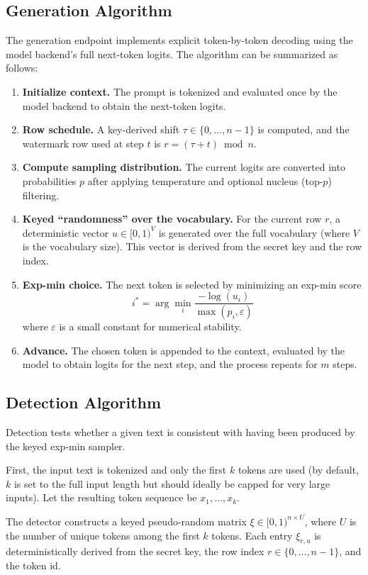 \subsection{Generation Algorithm}
The generation endpoint implements explicit token-by-token decoding using the model backend's full next-token logits. The algorithm can be summarized as follows:
\begin{enumerate}
    \item \textbf{Initialize context.} The prompt is tokenized and evaluated once by the model backend to obtain the next-token logits.
    \item \textbf{Row schedule.} A key-derived shift $\tau\in\{0,\dots,n-1\}$ is computed, and the watermark row used at step $t$ is $r=(\tau+t)\bmod n$.
    \item \textbf{Compute sampling distribution.} The current logits are converted into probabilities $p$ after applying temperature and optional nucleus (top-$p$) filtering.
    \item \textbf{Keyed ``randomness'' over the vocabulary.} For the current row $r$, a deterministic vector $u\in[0,1)^V$ is generated over the full vocabulary (where $V$ is the vocabulary size). This vector is derived from the secret key and the row index.
    \item \textbf{Exp-min choice.} The next token is selected by minimizing an exp-min score
          \[
              i^* = \arg\min_i \frac{-\log(u_i)}{\max(p_i,\varepsilon)}
          \]
          where $\varepsilon$ is a small constant for numerical stability.
    \item \textbf{Advance.} The chosen token is appended to the context, evaluated by the model to obtain logits for the next step, and the process repeats for $m$ steps.
\end{enumerate}

\subsection{Detection Algorithm}
Detection tests whether a given text is consistent with having been produced by the keyed exp-min sampler.

First, the input text is tokenized and only the first $k$ tokens are used (by default, $k$ is set to the full input length but should ideally be capped for very large inputs). Let the resulting token sequence be $x_1,\dots,x_k$.

The detector constructs a keyed pseudo-random matrix $\xi\in[0,1)^{n\times U}$, where $U$ is the number of unique tokens among the first $k$ tokens. Each entry $\xi_{r,u}$ is deterministically derived from the secret key, the row index $r\in\{0,\dots,n-1\}$, and the token id.

